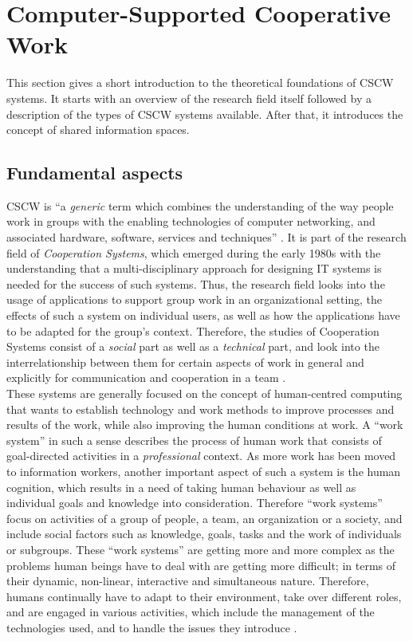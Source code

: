 
\section{Computer-Supported Cooperative Work}
\label{sec:cscw}

This section gives a short introduction to the theoretical foundations of \gls{CSCW} systems. It starts with an overview of the research field itself followed by a description of the types of \gls{CSCW} systems available. After that, it introduces the concept of shared information spaces.

\subsection{Fundamental aspects}
\label{sec:cscw_definition}

\gls{CSCW} is ``a \emph{generic} term which combines the understanding of the way people work in groups with the enabling technologies of computer networking, and associated hardware, software, services and techniques'' \citep[pg. 92]{borghoff2000computer}. It is part of the research field of \emph{Cooperation Systems}, which emerged during the early 1980s with the understanding that a multi-disciplinary approach for designing \gls{IT} systems is needed for the success of such systems. Thus, the research field looks into the usage of applications to support group work in an organizational setting, the effects of such a system on individual users, as well as how the applications have to be adapted for the group's context. Therefore, the studies of Cooperation Systems consist of a \emph{social} part as well as a \emph{technical} part, and look into the interrelationship between them for certain aspects of work in general and explicitly for communication and cooperation in a team \citep{Grudin1994}. \\

These systems are generally focused on the concept of human-centred computing that wants to establish technology and work methods to improve processes and results of the work, while also improving the human conditions at work. A ``work system'' in such a sense describes the process of human work that consists of goal-directed activities in a \emph{professional} context. As more work has been moved to information workers, another important aspect of such a system is the human cognition, which results in a need of taking human behaviour as well as individual goals and knowledge into consideration. Therefore ``work systems'' focus on activities of a group of people, a team, an organization or a society, and include social factors such as knowledge, goals, tasks and the work of individuals or subgroups. These ``work systems'' are getting more and more complex as the problems human beings have to deal with are getting more difficult; in terms of their dynamic, non-linear, interactive and simultaneous nature. Therefore, humans continually have to adapt to their environment, take over different roles, and are engaged in various activities, which include the management of the technologies used, and to handle the issues they introduce \citep{Hoffmann2009}. \\


